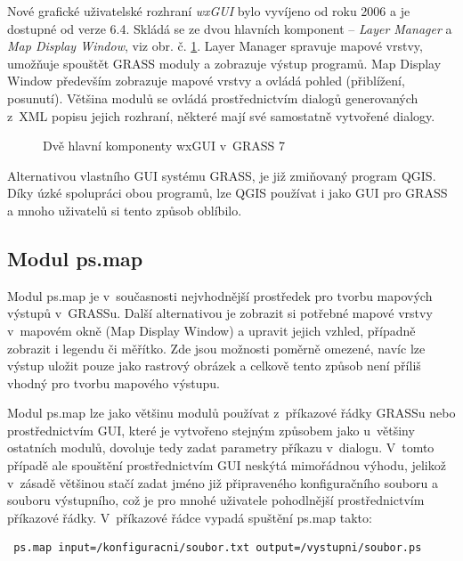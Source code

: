 \documentclass[a4paper,12pt,draft]{article}
\begin{document}
Nové grafické uživatelské rozhraní  \emph{wxGUI} bylo vyvíjeno od roku 2006 a je
dostupné od verze 6.4.  Skládá se ze dvou hlavních komponent -- \emph{Layer
Manager} a \emph{Map Display Window}, viz obr. č. \ref{fig:wxgui}. Layer
Manager spravuje mapové vrstvy, umožňuje spouštět GRASS moduly a zobrazuje
výstup programů. Map Display Window především zobrazuje mapové vrstvy
a ovládá pohled (přiblížení, posunutí). Většina modulů se ovládá
prostřednictvím dialogů generovaných z~XML popisu jejich rozhraní,
některé mají své samostatně vytvořené dialogy.
\begin{figure}[h!]
\centering
{}
\quad
{}
\caption{Dvě hlavní komponenty wxGUI v~GRASS 7\label{fig:wxgui}}

\end{figure}

Alternativou vlastního GUI systému GRASS, je již zmiňovaný
program QGIS. Díky úzké spolupráci obou programů, lze QGIS používat i jako GUI
pro GRASS a mnoho uživatelů si tento způsob oblíbilo.

\subsection{Modul ps.map}
\label{sec:psmap}
Modul ps.map je v~současnosti nejvhodnější prostředek pro tvorbu
mapových vý\-stupů v~GRASSu. Další alternativou je zobrazit si potřebné
mapové vrstvy v~mapovém okně (Map Display Window)  a upravit jejich vzhled,
případně zobrazit i legendu či měřítko. Zde jsou možnosti poměrně
omezené, navíc lze výstup uložit pouze jako rastrový obrázek a celkově
tento způsob není příliš vhodný pro tvorbu mapového výstupu.

Modul ps.map lze jako většinu modulů používat z~příkazové
řádky GRASSu nebo pro\-střed\-nic\-tvím GUI, které
je vytvořeno stejným způsobem jako u~většiny ostatních modulů,
dovoluje tedy zadat parametry příkazu v~dialogu. V~tomto případě ale
spouštění prostřednictvím GUI neskýtá mimořádnou výhodu,
jelikož v~zásadě většinou stačí zadat jméno již připraveného
konfiguračního souboru a souboru vý\-stupního, což je pro mnohé uživatele
pohodlnější prostřednictvím příkazové řádky. V~příkazové řádce
vypadá spuštění ps.map takto:
\begin{verbatim}
 ps.map input=/konfiguracni/soubor.txt output=/vystupni/soubor.ps
\end{verbatim}
\end{document}

